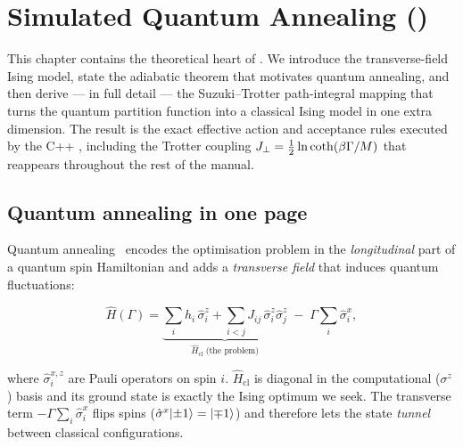 \chapter{Simulated Quantum Annealing ()}
\label{ch:sqa}

This chapter contains the theoretical heart of \qv. We introduce the
transverse-field Ising model, state the adiabatic theorem that motivates
quantum annealing, and then derive --- in full detail --- the Suzuki--Trotter
path-integral mapping that turns the quantum partition function into a
classical Ising model in one extra dimension. The result is the exact
effective action and acceptance rules executed by the C++
, including the Trotter coupling
$J_{\perp}=\tfrac12\ln\coth(\beta\Gamma/M)$ that reappears throughout the rest of
the manual.

\section{Quantum annealing in one page}
\label{sec:qa}

Quantum annealing~\cite{kadowaki,farhi} encodes the optimisation problem in
the \emph{longitudinal} part of a quantum spin Hamiltonian and adds a
\emph{transverse field} that induces quantum fluctuations:

\begin{keyeq}
\begin{equation}
\hat H(\Gamma)
=\underbrace{\sum_i h_i\,\hat\sigma^z_i+\sum_{i<j}J_{ij}\,\hat\sigma^z_i\hat\sigma^z_j}_{\hat H_{\mathrm{cl}}
\;\text{(the problem)}}
\;-\;\Gamma\sum_i \hat\sigma^x_i ,
\label{eq:tfim}
\end{equation}
\end{keyeq}

\noindent where $\hat\sigma^{x,z}_i$ are Pauli operators on spin $i$.
$\hat H_{\mathrm{cl}}$ is diagonal in the computational ($\sigma^z$) basis
and its ground state is exactly the Ising optimum we seek. The transverse
term $-\Gamma\sum_i\hat\sigma^x_i$ flips spins
($\hat\sigma^x\lvert \pm1\rangle=\lvert \mp1\rangle$) and therefore lets the state
\emph{tunnel} between classical configurations.

